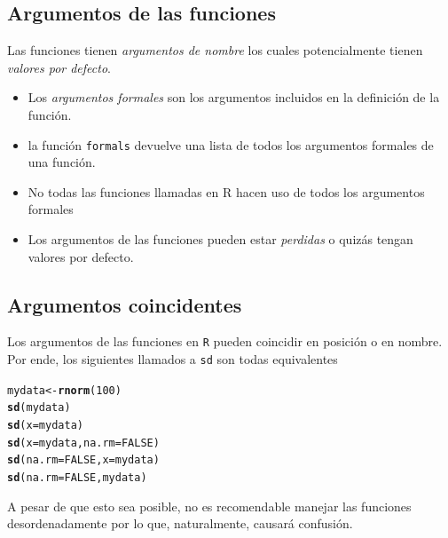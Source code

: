 \documentclass{article}\usepackage[]{graphicx}\usepackage[]{color}
\makeatletter
\newcommand{\hlnum}[1]{\textcolor[rgb]{0.686,0.059,0.569}{#1}}%
\newcommand{\hlstd}[1]{\textcolor[rgb]{0.345,0.345,0.345}{#1}}%
\newcommand{\hlkwb}[1]{\textcolor[rgb]{0.69,0.353,0.396}{#1}}%
\newcommand{\hlkwc}[1]{\textcolor[rgb]{0.333,0.667,0.333}{#1}}%
\newcommand{\hlkwd}[1]{\textcolor[rgb]{0.737,0.353,0.396}{\textbf{#1}}}%
\newenvironment{kframe}{%
 \def\at@end@of@kframe{}%
 \ifinner\ifhmode%
  \def\at@end@of@kframe{\end{minipage}}%
  \begin{minipage}{\columnwidth}%
 \fi\fi%
 \def\FrameCommand##1{\hskip\@totalleftmargin \hskip-\fboxsep
 \colorbox{shadecolor}{##1}\hskip-\fboxsep
     \hskip-\linewidth \hskip-\@totalleftmargin \hskip\columnwidth}%
 \MakeFramed {\advance\hsize-\width
   \@totalleftmargin\z@ \linewidth\hsize
   \@setminipage}}%
 {\par\unskip\endMakeFramed%
 \at@end@of@kframe}
\newenvironment{knitrout}{}{} %
\makeatother
\begin{document}
  \subsection{Argumentos de las funciones}
  Las funciones tienen \emph{argumentos de nombre} los cuales potencialmente tienen \emph{valores por defecto}.
  \begin{itemize}
    \item Los \emph{argumentos formales} son los argumentos incluidos en la definición de la función.
    \item la función \texttt{formals} devuelve una lista de todos los argumentos formales de una función.
    \item No todas las funciones llamadas en R hacen uso de todos los argumentos formales
    \item Los argumentos de las funciones pueden estar \emph{perdidas} o quizás tengan valores por defecto.
  \end{itemize}
  
  \subsection{Argumentos coincidentes}
  Los argumentos de las funciones en \texttt{R} pueden coincidir en posición o en nombre. Por ende, los siguientes llamados a \texttt{sd} son todas equivalentes
\begin{knitrout}
\color{fgcolor}\begin{kframe}
\begin{alltt}
  \hlstd{mydata} \hlkwb{<-} \hlkwd{rnorm}\hlstd{(}\hlnum{100}\hlstd{)}
  \hlkwd{sd}\hlstd{(mydata)}
  \hlkwd{sd}\hlstd{(}\hlkwc{x} \hlstd{= mydata)}
  \hlkwd{sd}\hlstd{(}\hlkwc{x} \hlstd{= mydata,} \hlkwc{na.rm} \hlstd{=} \hlnum{FALSE}\hlstd{)}
  \hlkwd{sd}\hlstd{(}\hlkwc{na.rm} \hlstd{=} \hlnum{FALSE}\hlstd{,} \hlkwc{x} \hlstd{= mydata)}
  \hlkwd{sd}\hlstd{(}\hlkwc{na.rm} \hlstd{=} \hlnum{FALSE}\hlstd{, mydata)}
\end{alltt}
\end{kframe}
\end{knitrout}
  
  A pesar de que esto sea posible, no es recomendable manejar las funciones desordenadamente por lo que, naturalmente, causará confusión.
\end{document}
